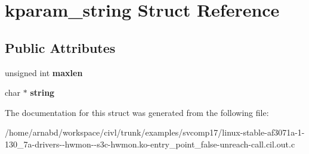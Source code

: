 \hypertarget{structkparam__string}{}\section{kparam\+\_\+string Struct Reference}
\label{structkparam__string}
\subsection*{Public Attributes}
\begin{DoxyCompactItemize}
\item 
\hypertarget{structkparam__string_abfd6102f7ba1bbf6d4dd1e8c6d276692}{}unsigned int {\bfseries maxlen}\label{structkparam__string_abfd6102f7ba1bbf6d4dd1e8c6d276692}

\item 
\hypertarget{structkparam__string_a0dee15b886d5b6279ec699aedce692dc}{}char $\ast$ {\bfseries string}\label{structkparam__string_a0dee15b886d5b6279ec699aedce692dc}

\end{DoxyCompactItemize}


The documentation for this struct was generated from the following file\+:\begin{DoxyCompactItemize}
\item 
/home/arnabd/workspace/civl/trunk/examples/svcomp17/linux-\/stable-\/af3071a-\/1-\/130\+\_\+7a-\/drivers-\/-\/hwmon-\/-\/s3c-\/hwmon.\+ko-\/entry\+\_\+point\+\_\+false-\/unreach-\/call.\+cil.\+out.\+c\end{DoxyCompactItemize}
